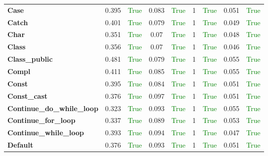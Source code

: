 \documentclass{article}
\begin{document}
\begin{xltabular}{\textwidth}{lcccccccc}
\textbf{{\fontsize{10}{12}\selectfont Case}}& 0.395&\textcolor{green}{True}& 0.083&\textcolor{green}{True}& 1&\textcolor{green}{True}& 0.051&\textcolor{green}{True} \\[0.5ex]
\textbf{{\fontsize{10}{12}\selectfont Catch}}& 0.401&\textcolor{green}{True}& 0.079&\textcolor{green}{True}& 1&\textcolor{green}{True}& 0.049&\textcolor{green}{True} \\[0.5ex]
\textbf{{\fontsize{10}{12}\selectfont Char}}& 0.351&\textcolor{green}{True}& 0.07&\textcolor{green}{True}& 1&\textcolor{green}{True}& 0.048&\textcolor{green}{True} \\[0.5ex]
\textbf{{\fontsize{10}{12}\selectfont Class}}& 0.356&\textcolor{green}{True}& 0.07&\textcolor{green}{True}& 1&\textcolor{green}{True}& 0.046&\textcolor{green}{True} \\[0.5ex]
\textbf{{\fontsize{10}{12}\selectfont Class\_public}}& 0.481&\textcolor{green}{True}& 0.079&\textcolor{green}{True}& 1&\textcolor{green}{True}& 0.055&\textcolor{green}{True} \\[0.5ex]
\textbf{{\fontsize{10}{12}\selectfont Compl}}& 0.411&\textcolor{green}{True}& 0.085&\textcolor{green}{True}& 1&\textcolor{green}{True}& 0.055&\textcolor{green}{True} \\[0.5ex]
\textbf{{\fontsize{10}{12}\selectfont Const}}& 0.395&\textcolor{green}{True}& 0.084&\textcolor{green}{True}& 1&\textcolor{green}{True}& 0.051&\textcolor{green}{True} \\[0.5ex]
\textbf{{\fontsize{10}{12}\selectfont Const\_cast}}& 0.376&\textcolor{green}{True}& 0.097&\textcolor{green}{True}& 1&\textcolor{green}{True}& 0.051&\textcolor{green}{True} \\[0.5ex]
\textbf{{\fontsize{10}{12}\selectfont Continue\_do\_while\_loop}}& 0.323&\textcolor{green}{True}& 0.093&\textcolor{green}{True}& 1&\textcolor{green}{True}& 0.055&\textcolor{green}{True} \\[0.5ex]
\textbf{{\fontsize{10}{12}\selectfont Continue\_for\_loop}}& 0.337&\textcolor{green}{True}& 0.089&\textcolor{green}{True}& 1&\textcolor{green}{True}& 0.053&\textcolor{green}{True} \\[0.5ex]
\textbf{{\fontsize{10}{12}\selectfont Continue\_while\_loop}}& 0.393&\textcolor{green}{True}& 0.094&\textcolor{green}{True}& 1&\textcolor{green}{True}& 0.047&\textcolor{green}{True} \\[0.5ex]
\textbf{{\fontsize{10}{12}\selectfont Default}}& 0.376&\textcolor{green}{True}& 0.093&\textcolor{green}{True}& 1&\textcolor{green}{True}& 0.051&\textcolor{green}{True} \\[0.5ex]

\end{xltabular}
\end{document}
